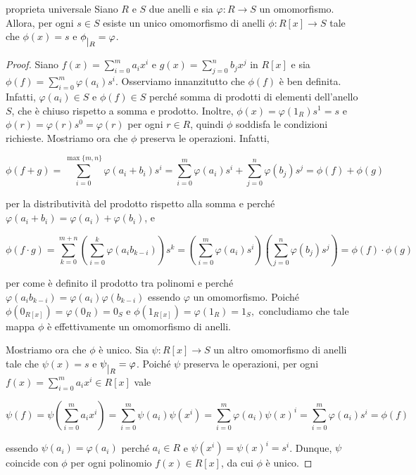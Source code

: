 \begin{teo}{proprieta universale}
Siano $R$ e $S$ due anelli e sia $\varphi\colon R\to S$ un omomorfismo. Allora, per ogni $s\in S$ esiste 
un unico omomorfismo di anelli $\phi\colon R[x]\to S$ tale che $\phi(x)=s$ e $\phi \raisebox{-.5em}{$\vert_{R}$}= \varphi$.
\end{teo}
\vspace{-4mm}
\begin{proof}Siano $f(x)=\sum\limits_{i=0}^m a_i x^i$ e $g(x)=\sum\limits_{j=0}^n b_j x^j$ in $R[x]$ 
e sia $\phi(f)=\sum\limits_{i=0}^m \varphi(a_i) s^i$. Osserviamo innanzitutto che $\phi(f)$ è ben definita. 
Infatti, $\varphi(a_i)\in S$ e $\phi(f)\in S$ perché somma di prodotti di elementi dell'anello $S$, 
che è chiuso rispetto a somma e prodotto. Inoltre, $\phi(x)=\varphi(1_R)s^1=s$ e $\phi(r)=\varphi(r)s^0=\varphi(r)$ 
per ogni $r\in R$, quindi $\phi$ soddisfa le condizioni richieste. Mostriamo ora che $\phi$ preserva le operazioni. Infatti, 

\[ \phi(f+g)=\sum\limits_{i=0}^{\max\{m,n\}}\varphi(a_i+b_i)s^i=\sum\limits_{i=0}^{m}\varphi(a_i)s^i+\sum\limits_{j=0}^{n}\varphi(b_j)s^j=\phi(f)+\phi(g) \] 

\noindent per la distributività del prodotto rispetto alla somma e perché $\varphi(a_i+b_i)=\varphi(a_i)+\varphi(b_i)$, e 

\[ \phi(f\cdot g)=\sum\limits_{k=0}^{m+n}\left(\sum\limits_{i=0}^{k}\varphi(a_ib_{k-i})\right)
s^k=\left(\sum\limits_{i=0}^{m}\varphi(a_i)s^i\right)\left(\sum\limits_{j=0}^{n}\varphi(b_j)s^j\right)=\phi(f)\cdot \phi(g) \] 

\noindent per come è definito il prodotto tra polinomi e perché $\varphi(a_ib_{k-i})=\varphi(a_i)\varphi(b_{k-i})$ essendo $\varphi$ 
un omomorfismo. Poiché $\phi(0_{R[x]})=\varphi(0_R)=0_S$ e $\phi(1_{R[x]})=\varphi(1_R)=1_S,$ 
concludiamo che tale mappa $\phi$ è effettivamente un omomorfismo di anelli.

\vspace{2mm}

\noindent Mostriamo ora che $\phi$ è unico. Sia $\psi\colon R[x]\to S$ un altro omomorfismo di anelli 
tale che $\psi(x)=s$ e $\psi \raisebox{-.5em}{$\vert_{R}$}= \varphi$. 
Poiché $\psi$ preserva le operazioni, per ogni $f(x)=\sum\limits_{i=0}^m a_i x^i\in R[x]$ vale 

\[ \psi(f) = \psi\left( \sum\limits_{i=0}^m a_i x^i \right) = 
\sum\limits_{i=0}^m \psi(a_i) \psi(x^i)=\sum\limits_{i=0}^m \varphi(a_i) \psi(x)^i=\sum\limits_{i=0}^m \varphi(a_i) s^i=\phi(f) \] 

\noindent essendo $\psi(a_i)=\varphi(a_i)$ perché $a_i\in R$ e $\psi(x^i)=\psi(x)^i=s^i$. 
Dunque, $\psi$ coincide con $\phi$ per ogni polinomio $f(x)\in R[x]$, da cui $\phi$ è unico.
\end{proof}

